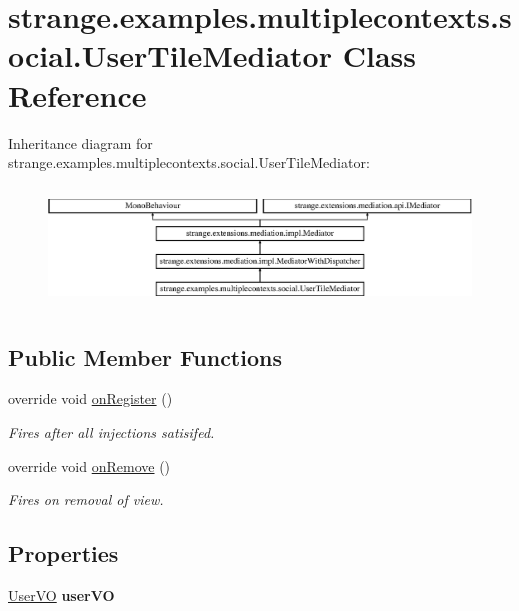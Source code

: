 \hypertarget{classstrange_1_1examples_1_1multiplecontexts_1_1social_1_1_user_tile_mediator}{\section{strange.\-examples.\-multiplecontexts.\-social.\-User\-Tile\-Mediator Class Reference}
\label{classstrange_1_1examples_1_1multiplecontexts_1_1social_1_1_user_tile_mediator}
}
Inheritance diagram for strange.\-examples.\-multiplecontexts.\-social.\-User\-Tile\-Mediator\-:\begin{figure}[H]
\begin{center}
\leavevmode
\includegraphics[height=3.227666cm]{classstrange_1_1examples_1_1multiplecontexts_1_1social_1_1_user_tile_mediator}
\end{center}
\end{figure}
\subsection*{Public Member Functions}
\begin{DoxyCompactItemize}
\item 
override void \hyperlink{classstrange_1_1examples_1_1multiplecontexts_1_1social_1_1_user_tile_mediator_a90703b25d408484f63c074a53d1b35a9}{on\-Register} ()
\begin{DoxyCompactList}\small\item\em Fires after all injections satisifed. \end{DoxyCompactList}\item 
override void \hyperlink{classstrange_1_1examples_1_1multiplecontexts_1_1social_1_1_user_tile_mediator_a1a295dcaa3c51b4bfadae90ece85e69b}{on\-Remove} ()
\begin{DoxyCompactList}\small\item\em Fires on removal of view. \end{DoxyCompactList}\end{DoxyCompactItemize}
\subsection*{Properties}
\begin{DoxyCompactItemize}
\item 
\hypertarget{classstrange_1_1examples_1_1multiplecontexts_1_1social_1_1_user_tile_mediator_a69780994adbe6a77e2af7e7685d2c955}{\hyperlink{classstrange_1_1examples_1_1multiplecontexts_1_1social_1_1_user_v_o}{User\-V\-O} {\bfseries user\-V\-O}}\label{classstrange_1_1examples_1_1multiplecontexts_1_1social_1_1_user_tile_mediator_a69780994adbe6a77e2af7e7685d2c955}

\end{DoxyCompactItemize}
